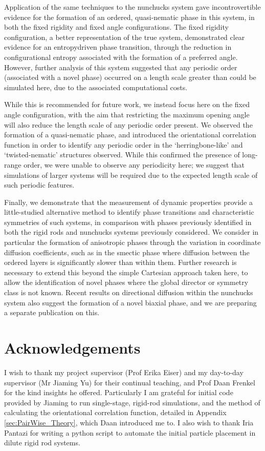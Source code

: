 \documentclass[11pt, a4paper]{article} %
\begin{document}
Application of the same techniques to the nunchucks system gave incontrovertible evidence for the formation of an ordered, quasi-nematic phase in this system, in both the fixed rigidity and fixed angle configurations. The fixed rigidity configuration, a better representation of the true system, demonstrated clear evidence for an entropy\textendash driven phase transition, through the reduction in configurational entropy associated with the formation of a preferred angle. However, further analysis of this system suggested that any periodic order (associated with a novel phase) occurred on a length scale greater than could be simulated here, due to the associated computational costs.

While this is recommended for future work, we instead focus here on the fixed angle configuration, with the aim that restricting the maximum opening angle will also reduce the length scale of any periodic order present. We observed the formation of a quasi-nematic phase, and introduced the orientational correlation function in order to identify any periodic order in the `herringbone-like' and `twisted-nematic' structures observed. While this confirmed the presence of long-range order, we were unable to observe any periodicity here; we suggest that simulations of larger systems will be required due to the expected length scale of such periodic features.

Finally, we demonstrate that the measurement of dynamic properties provide a little-studied alternative method to identify phase transitions and characteristic symmetries of such systems, in comparison with phases previously identified in both the rigid rods and nunchucks systems previously considered. We consider in particular the formation of anisotropic phases through the variation in coordinate diffusion coefficients, such as in the smectic phase where diffusion between the ordered layers is significantly slower than within them. Further research is necessary to extend this beyond the simple Cartesian approach taken here, to allow the identification of novel phases where the global director or symmetry class is not known. Recent results on directional diffusion within the nunchucks system also suggest the formation of a novel biaxial phase, and we are preparing a separate publication on this.


\section*{Acknowledgements}
I wish to thank my project supervisor (Prof Erika Eiser) and my day-to-day supervisor (Mr Jiaming Yu) for their continual teaching, and Prof Daan Frenkel for the kind insights he offered. Particularly I am grateful for initial code provided by Jiaming to run single-stage, rigid-rod simulations, and the method of calculating the orientational correlation function, detailed in Appendix \ref{sec:PairWise_Theory}, which Daan introduced me to. I also wish to thank Iria Pantazi for writing a python script to automate the initial particle placement in dilute rigid rod systems.
\end{document}

